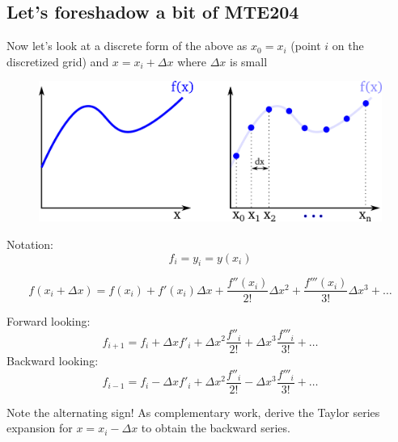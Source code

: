 \subsection*{Let's foreshadow a bit of MTE204}
Now let's look at a discrete form of the above as $x_0=x_{i}$ (point $i$ on the discretized grid) and $x=x_{i}+\Delta x$ where $\Delta x$ is small
\begin{figure}
\includegraphics[width=\textwidth]{figs/discretization.png}\par
\end{figure}
\begin{center}
Notation: 
\begin{equation*}
\boxed{f_i=y_i=y(x_i)}
\end{equation*}
\end{center}

\begin{equation*}
f(x_{i}+\Delta x)=f(x_{i})+f'(x_{i})\Delta x+\frac{f''(x_{i})}{2!}\Delta x^{2}+\frac{f'''(x_{i})}{3!}\Delta x^{3}+\hdots
\end{equation*}

Forward looking:
\begin{equation*}
f_{i+1}=f_{i}+\Delta x f'_{i}+\Delta x^{2} \frac{f''_{i}}{2!}+\Delta x^{3} \frac{f'''_{i}}{3!}+\hdots
\end{equation*}
Backward looking:
\begin{equation*}
f_{i-1}=f_{i}-\Delta x f'_{i}+\Delta x^{2} \frac{f''_{i}}{2!}-\Delta x^{3} \frac{f'''_{i}}{3!}+\hdots
\end{equation*}

Note the alternating sign! As complementary work, derive the Taylor series expansion for $x=x_{i}-\Delta x$ to obtain the backward series.



